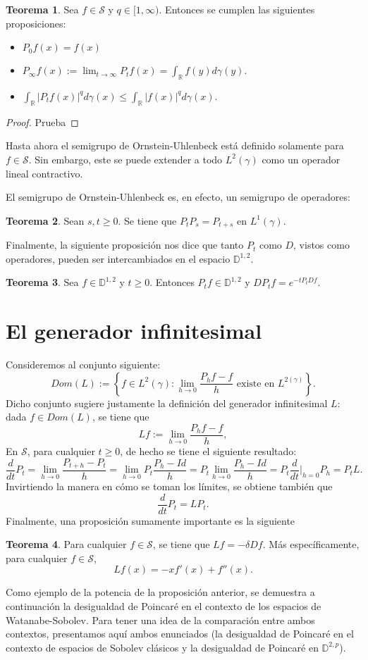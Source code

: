 \documentclass[letterpaper,twoside]{book}
\newcommand{\R}{\mathbb{R}}
\newcommand{\D}{\mathbb{D}}
\renewcommand{\S}{\mathcal{S}}
\newcommand{\1}{\mathds{1}}
\newcommand{\abs}[1]{\left\lvert #1 \right\rvert}
\renewcommand{\to}{\rightarrow}
\theoremstyle{definition}
\theoremstyle{definition}
\newtheorem{teo}{Teorema}
\theoremstyle{definition}
\theoremstyle{definition}
\theoremstyle{definition}
\theoremstyle{definition}
\theoremstyle{definition}
\begin{document}
\begin{teo}
    Sea $f\in \mathcal{S}$ y $q\in [1,\infty)$. Entonces se cumplen las siguientes proposiciones:
    \begin{itemize}
        \item $P_0f(x)=f(x)$
        \item $P_\infty f(x):=\displaystyle\lim_{t\to\infty}P_tf(x)=\int_\R f(y)d\gamma(y)$.
        \item $\displaystyle\int_\R \abs{P_tf(x)}^qd\gamma(x)\leq \int_\R\abs{f(x)}^qd\gamma(x)$.
    \end{itemize}
\end{teo}
\begin{proof} 
    Prueba
 \end{proof}
Hasta ahora el semigrupo de Ornstein-Uhlenbeck está definido solamente para $f\in \mathcal{S}$. Sin embargo, este se puede extender a todo $L^2(\gamma)$ como un operador lineal contractivo.

El semigrupo de Ornstein-Uhlenbeck es, en efecto, un semigrupo de operadores:
\begin{teo} 
 Sean $s,t\geq0$. Se tiene que $P_tP_s=P_{t+s}$ en $L^1(\gamma)$.
 \end{teo}
 Finalmente, la siguiente proposición nos dice que tanto $P_t$ como $D$, vistos como operadores, pueden ser intercambiados en el espacio $\mathbb{D}^{1,2}$.
 \begin{teo} 
  Sea $f\in \D^{1,2}$ y $t\geq0$. Entonces $P_tf\in \D^{1,2}$ y $DP_tf=e^{-tP_tDf}$.
  \end{teo}

\section{El generador infinitesimal}
  Consideremos al conjunto siguiente:
  \[
  Dom(L):=\left\{f\in L^2(\gamma): \lim_{h\to 0} \frac{P_{h}f-f}{h} \text{ existe en } L^{2(\gamma)}\right\}.
  \]  
Dicho conjunto sugiere justamente la definición del generador infinitesimal $L$: dada $f\in Dom(L)$, se tiene que 
\[
Lf:=\lim_{h\to 0}\frac{P_hf-f}{h},    
\]
En $\S$, para cualquier $t\geq0$, de hecho se tiene el siguiente resultado:
\[
\frac{d}{dt}P_t=\lim_{h\to0}\frac{P_{t+h}-P_t}{h}=\lim_{h\to0}P_t\frac{P_h-Id}{h}=P_t\lim_{h\to0}\frac{P_h-Id}{h}=P_t\frac{d}{dt}\Bigg|_{h=0}P_h=P_tL.
\]
Invirtiendo la manera en cómo se toman los límites, se obtiene también que
\[
\frac{d}{dt}P_t=LP_t.    
\]
Finalmente, una proposición sumamente importante es la siguiente
\begin{teo} 
 Para cualquier $f\in \S$, se tiene que $Lf=-\delta Df$. Más específicamente, para cualquier $f\in \S$, 
 \[
 Lf(x)=-xf'(x)+f''(x).   
 \]
 \end{teo}
 Como ejemplo de la potencia de la proposición anterior, se demuestra a continuación la desigualdad de Poincaré en el contexto de los espacios de Watanabe-Sobolev.
Para tener una idea de la comparación entre ambos contextos, presentamos aquí ambos enunciados (la desigualdad de Poincaré en el contexto de espacios de Sobolev clásicos y la desigualdad de Poincaré en $\D^{2,p}$).
 
\end{document}
